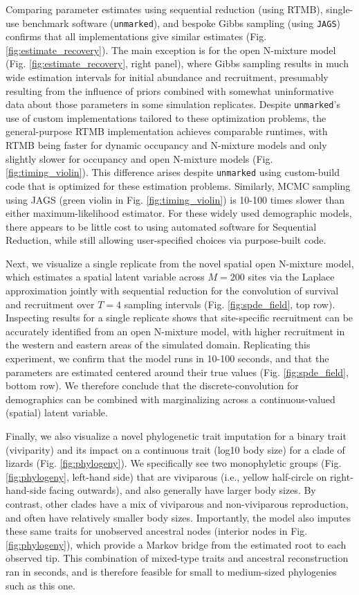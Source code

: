 \documentclass[11pt]{article}
\begin{document}
Comparing parameter estimates using sequential reduction (using RTMB), single-use benchmark software (\texttt{unmarked}), and bespoke Gibbs sampling (using \texttt{JAGS}) confirms that all implementations give similar estimates (Fig. \ref{fig:estimate_recovery}).  The main exception is for the open N-mixture model (Fig. \ref{fig:estimate_recovery}, right panel), where Gibbs sampling results in much wide estimation intervals for initial abundance and recruitment, presumably resulting from the influence of priors combined with somewhat uninformative data about those parameters in some simulation replicates.  Despite \texttt{unmarked}'s use of custom implementations tailored to these optimization problems, the general-purpose RTMB implementation achieves comparable runtimes, with RTMB being faster for dynamic occupancy and N-mixture models and only slightly slower for occupancy and open N-mixture models (Fig. \ref{fig:timing_violin}).  This difference arises despite \texttt{unmarked} using custom-build code that is optimized for these estimation problems.  Similarly, MCMC sampling using JAGS (green violin in Fig. \ref{fig:timing_violin}) is 10-100 times slower than either maximum-likelihood estimator.  For these widely used demographic models, there appears to be little cost to using automated software for Sequential Reduction, while still allowing user-specified choices via purpose-built code.         

Next, we visualize a single replicate from the novel spatial open N-mixture model, which estimates a spatial latent variable across $M=200$ sites via the Laplace approximation jointly with sequential reduction for the convolution of survival and recruitment over $T=4$ sampling intervals (Fig. \ref{fig:spde_field}, top row).  Inspecting results for a single replicate shows that site-specific recruitment can be accurately identified from an open N-mixture model, with higher recruitment in the western and eastern areas of the simulated domain.  Replicating this experiment, we confirm that the model runs in 10-100 seconds, and that the parameters are estimated centered around their true values (Fig. \ref{fig:spde_field}, bottom row).  We therefore conclude that the discrete-convolution for demographics can be combined with marginalizing across a continuous-valued (spatial) latent variable.  

Finally, we also visualize a novel phylogenetic trait imputation for a binary trait (viviparity) and its impact on a continuous trait (log10 body size) for a clade of lizards (Fig. \ref{fig:phylogeny}).  We specifically see two monophyletic groups (Fig. \ref{fig:phylogeny}, left-hand side) that are viviparous (i.e., yellow half-circle on right-hand-side facing outwards), and also generally have larger body sizes.  By contrast, other clades have a mix of viviparous and non-viviparous reproduction, and often have relatively smaller body sizes.  Importantly, the model also imputes these same traits for unobserved ancestral nodes (interior nodes in Fig. \ref{fig:phylogeny}), which provide a Markov bridge from the estimated root to each observed tip.  This combination of mixed-type traits and ancestral reconstruction ran in seconds, and is therefore feasible for small to medium-sized phylogenies such as this one.  
\end{document}
